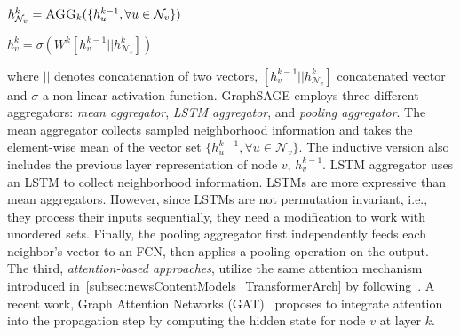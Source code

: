 \begin{center}
    $h_{\mathcal{N}_v}^{k} = \textsc{AGG}_{k}(\{h_u^{k-1}, \forall u \in \mathcal{N}_v\})$
\end{center}
\begin{center}
    $h_v^k = \sigma(W^k [h_v^{k-1} || h_{\mathcal{N}_v}^k])$
\end{center}
where $||$ denotes concatenation of two vectors, $[h_v^{k-1} || h_{\mathcal{N}_v}^k]$ concatenated vector and $\sigma$
a non-linear activation function. GraphSAGE employs three different aggregators: \emph{mean aggregator}, \emph{LSTM aggregator}, and \emph{pooling aggregator}. The mean aggregator collects sampled neighborhood information and takes the element-wise mean of the vector set $\{h_u^{k-1}, \forall u \in \mathcal{N}_v\}$. The inductive version also includes the previous layer representation of node $v$, $h_v^{k-1}$. LSTM aggregator uses an LSTM to collect neighborhood information. LSTMs are more expressive than mean aggregators. However, since LSTMs are not permutation invariant, i.e., they process
their inputs sequentially, they need a modification to work with unordered sets. Finally, the pooling aggregator first independently feeds each neighbor's vector to an FCN, then applies a pooling operation on the output.\\
The third, \emph{attention-based approaches}, utilize the same attention mechanism introduced in~\ref{subsec:newsContentModels_TransformerArch} by following~\cite{NeuralMachineTranslationByJointlyLearning_Bahdanau}. A recent work, Graph Attention Networks (GAT)~\parencite{GraphAttentionNetworks_Velickovic} proposes to integrate attention into the propagation step by computing the hidden state for node $v$ at layer $k$.
